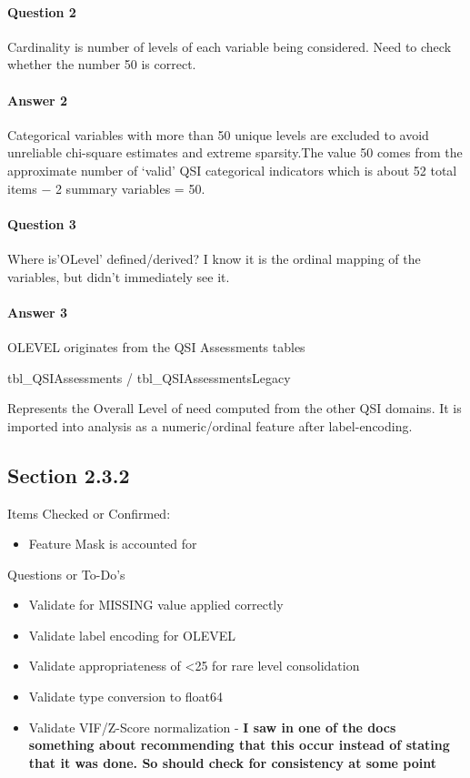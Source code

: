 \documentclass[12pt, letterpaper]{article}
\begin{document}
\paragraph{Question 2} Cardinality is number of levels of each variable being considered. Need to check whether the number 50 is correct.
\paragraph{Answer 2} Categorical variables with more than 50 unique levels are excluded to avoid unreliable chi-square estimates and extreme sparsity.The value 50 comes from the approximate number of `valid' QSI categorical indicators which is about 52 total items − 2 summary variables = 50.
\paragraph{Question 3} Where is'OLevel' defined/derived? I know it is the ordinal mapping of the variables, but didn't immediately see it.
\paragraph{Answer 3}OLEVEL originates from the QSI Assessments tables 

tbl_QSIAssessments / tbl_QSIAssessmentsLegacy

Represents the Overall Level of need computed from the other QSI domains. It is imported into analysis as a numeric/ordinal feature after label-encoding.

\subsection{Section 2.3.2} Items Checked or Confirmed:\\
\begin{itemize}
	\item Feature Mask is accounted for 

\end{itemize}

Questions or To-Do's\\
\begin{itemize}
	\item Validate for MISSING value applied correctly
	\item Validate label encoding for OLEVEL
	\item Validate appropriateness of <25 for rare level consolidation
	\item Validate type conversion to float64
	\item Validate VIF/Z-Score normalization - \textbf{I saw in one of the docs something about recommending that this occur instead of stating that it was done. So should check for consistency at some point}
\end{itemize}
\end{document}
